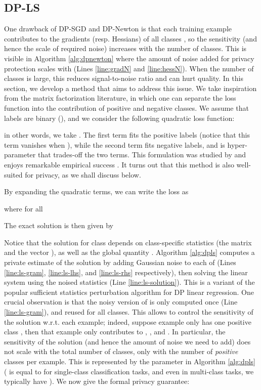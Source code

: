 \documentclass[letterpaper]{article} \usepackage{fullpage}
\begin{document}
\subsection{DP-LS}
One drawback of DP-SGD and DP-Newton is that each training example  contributes to the gradients (resp. Hessians) of all classes , so the sensitivity (and hence the scale of required noise) increases with the number of classes. This is visible in Algorithm \ref{alg:dpnewton} where the amount of noise added for privacy protection scales with  (Lines \ref{line:gradN} and \ref{line:hessN}). When the number of classes is large, this reduces signal-to-noise ratio and can hurt quality. In this section, we develop a method that aims to address this issue. We take inspiration from the matrix factorization literature, in which one can separate the loss function into the contribution of positive and negative classes. We assume that labels are binary (), and we consider the following quadratic loss function:

in other words, we take . The first term fits the positive labels (notice that this term vanishes when ), while the second term fits negative labels, and  is hyper-parameter that trades-off the two terms. This formulation was studied by \cite{hu2008ials} and enjoys remarkable empirical success \cite{koren2015collaborative}. It turns out that this method is also well-suited for privacy, as we shall discuss below.

By expanding the quadratic terms, we can write the loss as

where for all 

The exact solution is then given by

Notice that the solution  for class  depends on class-specific statistics (the matrix  and the vector ), as well as the global quantity . Algorithm \ref{alg:dpls} computes a private estimate of the solution by adding Gaussian noise to each of  (Lines \ref{line:ls-gram}, \ref{line:ls-lhs}, and \ref{line:ls-rhs} respectively), then solving the linear system using the noised statistics (Line \ref{line:ls-solution}). This is a variant of the popular sufficient statistics perturbation algorithm for DP linear regression. One crucial observation is that the noisy version of  is only computed once (Line \ref{line:ls-gram}), and reused for all classes. This allows to control the sensitivity of the solution w.r.t. each example; indeed, suppose example  only has one positive class , then that example only contributes to , , and . In particular, the sensitivity of the solution (and hence the amount of noise we need to add) does not scale with the total number of classes, only with the number of \emph{positive} classes per example. This is represented by the parameter  in Algorithm \ref{alg:dpls} ( is equal to  for single-class classification tasks, and even in multi-class tasks, we typically have ). We now give the formal privacy guarantee:
\end{document}
